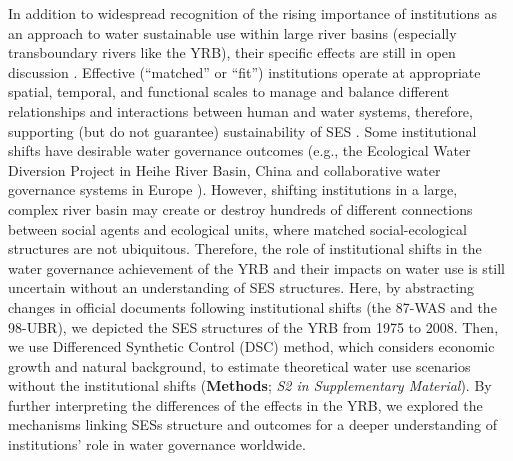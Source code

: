 In addition to widespread recognition of the rising importance of institutions as an approach to water sustainable use within large river basins (especially transboundary rivers like the YRB), their specific effects are still in open discussion \cite{agrawal2003, persha2011, agrawal2001}.
Effective (``matched'' or ``fit'') institutions operate at appropriate spatial, temporal, and functional scales to manage and balance different relationships and interactions between human and water systems, therefore, supporting (but do not guarantee) sustainability of SES \cite{epstein2015, wang2019d}.
Some institutional shifts have desirable water governance outcomes (e.g., the Ecological Water Diversion Project in Heihe River Basin, China \cite{wang2019d} and collaborative water governance systems in Europe \cite{green2013}).
However, shifting institutions in a large, complex river basin may create or destroy hundreds of different connections between social agents and ecological units, where matched social-ecological structures are not ubiquitous.
Therefore, the role of institutional shifts in the water governance achievement of the YRB and their impacts on water use is still uncertain without an understanding of SES structures.
Here, by abstracting changes in official documents following institutional shifts (the 87-WAS and the 98-UBR), we depicted the SES structures of the YRB from 1975 to 2008.
Then, we use Differenced Synthetic Control (DSC) method, which considers economic growth and natural background, to estimate theoretical water use scenarios without the institutional shifts (\textbf{Methods}; \textit{S2 in Supplementary Material}).
By further interpreting the differences of the effects in the YRB, we explored the mechanisms linking SESs structure and outcomes for a deeper understanding of institutions' role in water governance worldwide.
